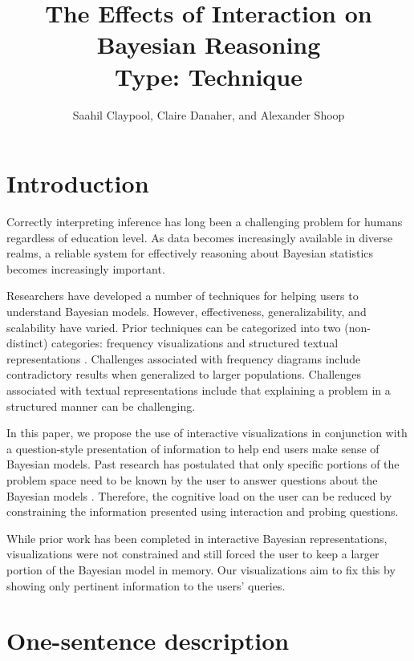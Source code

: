 \documentclass{proc}
\begin{document}
\title{%
    The Effects of Interaction on Bayesian Reasoning \\
    \large Type: Technique
}

\author{Saahil Claypool, Claire Danaher, and Alexander Shoop}

\maketitle

\section{Introduction}
Correctly interpreting inference has long been a challenging problem for humans regardless of education level. As data becomes increasingly available in diverse realms, a reliable system for effectively reasoning about Bayesian statistics becomes increasingly important. 

Researchers have developed a number of techniques for 
helping users to understand Bayesian models. However, effectiveness, generalizability, and scalability have varied. Prior techniques can be categorized into two (non-distinct) categories: 
frequency visualizations and structured textual representations \cite{Ottley2016}. Challenges associated with frequency diagrams include contradictory results when generalized to larger populations. Challenges associated with textual representations include that explaining a problem in a structured manner can be challenging.  

In this paper, we propose the use of interactive visualizations in conjunction with a question-style presentation of information to help end users make sense of Bayesian models. Past research has postulated that only specific portions of the problem space need to be known by the user to answer questions about the Bayesian models \cite{Gigerenzer1995}. Therefore, the cognitive load on the user can be reduced by constraining the information presented using interaction and probing questions. 

While prior work has been completed in interactive Bayesian representations, visualizations were not constrained and still forced the user to keep a larger portion of the Bayesian model in memory. Our visualizations aim to fix this by showing only pertinent information to the users' queries. 

\section{One-sentence description}
\end{document}
